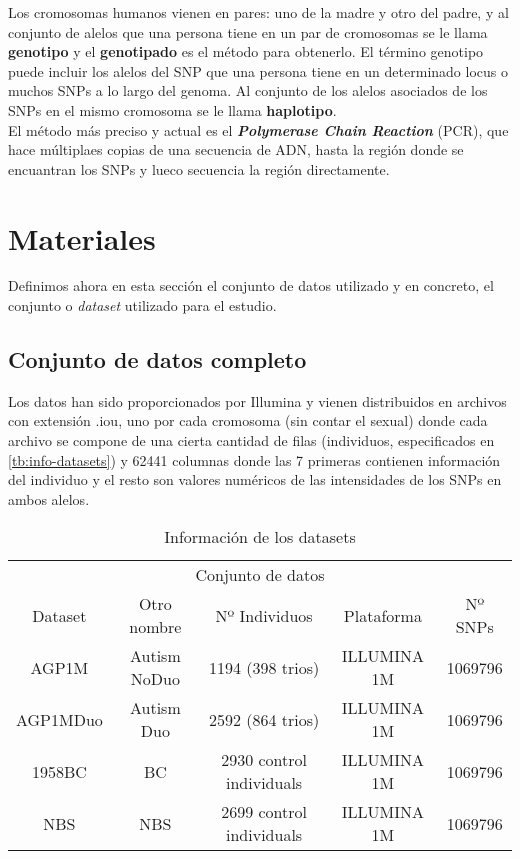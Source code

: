 Los cromosomas humanos vienen en pares: uno de la madre y otro del padre, y al conjunto de alelos que una persona tiene en un par de cromosomas se le llama \textbf{genotipo} y el \textbf{genotipado} es el método para obtenerlo. El término genotipo puede incluir los alelos del SNP que una persona tiene en un determinado locus o muchos SNPs a lo largo del genoma. Al conjunto de los alelos asociados de los SNPs en el mismo cromosoma se le llama \textbf{haplotipo}.\\
El método más preciso y actual es el \textbf{\textit{Polymerase Chain Reaction}} (PCR), que hace múltiplaes copias de una secuencia de ADN, hasta la región donde se encuantran los SNPs y lueco secuencia la región directamente.
\newpage
\section{Materiales}
Definimos ahora en esta sección el conjunto de datos utilizado y en concreto, el conjunto o \textit{dataset} utilizado para el estudio.
\subsection{Conjunto de datos completo}
Los datos han sido proporcionados por Illumina y vienen distribuidos en archivos con extensión .iou, uno por cada cromosoma (sin contar el sexual) donde cada archivo se compone de una cierta cantidad de filas (individuos, especificados en \autoref{tb:info-datasets}) y 62441 columnas donde las 7 primeras contienen información del individuo y el resto son valores numéricos de las intensidades de los SNPs en ambos alelos.

\begin{table}[htpb]
  \centering
  \begin{tabular}{ccccc} \toprule
    \multicolumn{5}{c}{Conjunto de datos} \\ \cmidrule(r){1-5}
    Dataset & Otro nombre & Nº Individuos & Plataforma & Nº SNPs          \\ \midrule
    AGP1M & Autism NoDuo & 1194 (398 trios) & ILLUMINA 1M & 1069796          \\ 
    AGP1MDuo & Autism Duo & 2592 (864 trios) & ILLUMINA 1M & 1069796          \\ 
    1958BC & BC & 2930 control individuals & ILLUMINA 1M & 1069796          \\
    NBS & NBS & 2699 control individuals & ILLUMINA 1M & 1069796          \\ \bottomrule
  \end{tabular}
  \caption{Información de los datasets}
  \label{tb:info-datasets}
\end{table}

